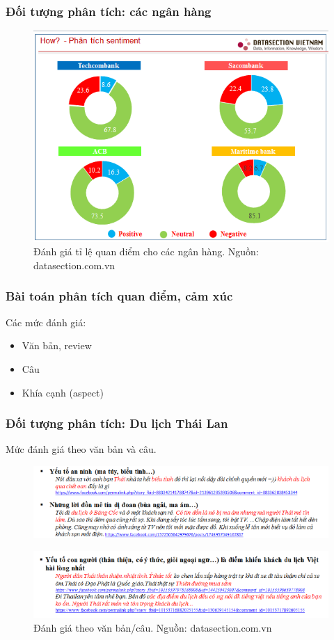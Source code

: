 \documentclass{beamer}
\begin{document}
\begin{frame}
\frametitle{Đối tượng phân tích: các ngân hàng}
\begin{center}
\begin{figure}
\includegraphics[scale=0.5]{Image/Bank.png}
\caption*{Đánh giá tỉ lệ quan điểm cho các ngân hàng. Nguồn: datasection.com.vn}
\label{labels:1}
\end{figure}
\end{center}
\end{frame}

\begin{frame}
\frametitle{Bài toán phân tích quan điểm, cảm xúc}
Các mức đánh giá:
\begin{itemize}
\item Văn bản, review
\item Câu
\item Khía cạnh (aspect)
\end{itemize}
\end{frame}

\begin{frame}
\frametitle{Đối tượng phân tích: Du lịch Thái Lan}
Mức đánh giá theo văn bản và câu.
\begin{center}
\begin{figure}
\includegraphics[scale=0.5]{Image/thailan2.png}
\label{labels:1}
\end{figure}
\begin{figure}
\includegraphics[scale=0.5]{Image/thailan3.png}
\caption*{Đánh giá theo văn bản/câu. Nguồn: datasection.com.vn}
\label{labels:1}
\end{figure}
\end{center}
\end{frame}
\end{document}
